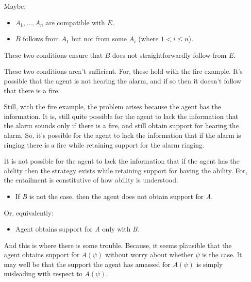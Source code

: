 \documentclass[10pt]{article}
\begin{document}
\begin{note}[Account?]
  Maybe:
  \begin{itemize}
  \item \(A_{1}, \dots, A_{n}\) are compatible with \(E\).
  \item \(B\) follows from \(A_{1}\) but not from some \(A_{i}\) (where \(1 < i \leq n\)).
  \end{itemize}
  These two conditions ensure that \(B\) does not straightforwardly follow from \(E\).

  These two conditions aren't sufficient.
  For, these hold with the fire example.
  It's possible that the agent is not hearing the alarm, and if so then it doesn't follow that there is a fire.

  Still, with the fire example, the problem arises because the agent has the information.
  It is, still quite possible for the agent to lack the information that the alarm sounds only if there is a fire, and still obtain support for hearing the alarm.
  So, it's possible for the agent to lack the information that if the alarm is ringing there is a fire while retaining support for the alarm ringing.

  It is not possible for the agent to lack the information that if the agent has the ability then the strategy exists while retaining support for having the ability.
  For, the entailment is constitutive of how ability is understood.

  \begin{itemize}
  \item If \emph{B} is not the case, then the agent does not obtain support for \emph{A}.
  \end{itemize}
  Or, equivalently:
  \begin{itemize}
  \item Agent obtains support for \emph{A} only with \emph{B}.
  \end{itemize}
  And this is where there is some trouble.
  Because, it seems plausible that the agent obtains support for \(A(\psi)\) without worry about whether \(\psi\) is the case.
  It may well be that the support the agent has amassed for \(A(\psi)\) is simply misleading with respect to \(A(\psi)\).
\end{note}
\end{document}
